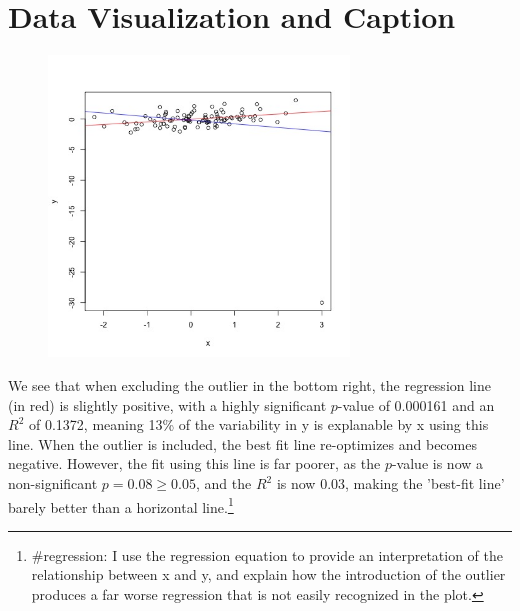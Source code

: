 \documentclass[11pt, oneside]{article}
\begin{document}
\section*{Data Visualization and Caption}
\begin{figure}[h]
	\includegraphics[width = 8cm, height = 8cm]{q1.jpg}
\end{figure}
We see that when excluding the outlier in the bottom right, the regression line (in red) is slightly positive, with a highly significant $p$-value of 0.000161 and an $R^2$ of 0.1372, meaning 13\% of the variability in y is explanable by x using this line. When the outlier is included, the best fit line re-optimizes and becomes negative. However, the fit using this line is far poorer, as the $p$-value is now a non-significant $p = 0.08 \geq 0.05$, and the $R^2$ is now 0.03, making the 'best-fit line' barely better than a horizontal line.\footnote{\#regression: I use the regression equation to provide an interpretation of the relationship between x and y, and explain how the introduction of the outlier produces a far worse regression that is not easily recognized in the plot.}

\newpage
\end{document}
